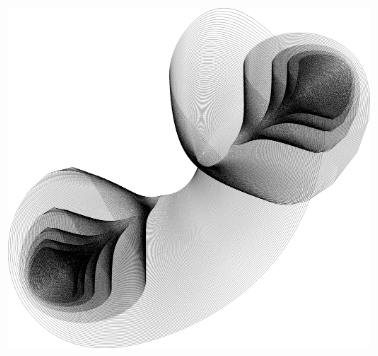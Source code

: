 \documentclass[xcolor=dvipsnames]{beamer}
\begin{document}
\begin{frame}
\begin{center}
\includegraphics[height=9cm]{graphics/moduli_plot_p2.png}
\end{center}
\end{frame}



\end{document}
